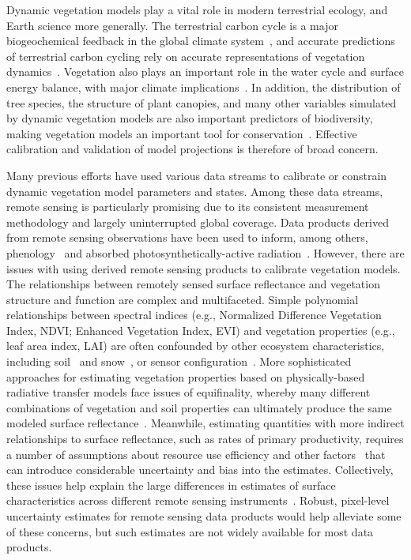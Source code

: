 \introduction

Dynamic vegetation models play a vital role in modern terrestrial ecology, and Earth science more generally.
The terrestrial carbon cycle is a major biogeochemical feedback in the global climate system~\citep{heinze_2019_esd_reviews}, and accurate predictions of terrestrial carbon cycling rely on accurate representations of vegetation dynamics~\citep{pacala_1995_details_that_matter}.
Vegetation also plays an important role in the water cycle and surface energy balance, with major climate implications~\citep{bonan2008forests}.
In addition, the distribution of tree species, the structure of plant canopies, and many other variables simulated by dynamic vegetation models are also important predictors of biodiversity, making vegetation models an important tool for conservation~\citep{mcmahon2011improving}.
Effective calibration and validation of model projections is therefore of broad concern.

Many previous efforts have used various data streams to calibrate or constrain dynamic vegetation model parameters and states.
Among these data streams, remote sensing is particularly promising due to its consistent measurement methodology and largely uninterrupted global coverage.
Data products derived from remote sensing observations have been used to inform, among others,
phenology~\citep{knorr2010carbon, viskari2015modeldata}
and absorbed photosynthetically-active radiation~\citep{peylin2016new, schurmann2016constraining, zobitz_2014_joint}.
However, there are issues with using derived remote sensing products to calibrate vegetation models.
The relationships between remotely sensed surface reflectance and vegetation structure and function are complex and multifaceted.
Simple polynomial relationships between spectral indices (e.g., Normalized Difference Vegetation Index, NDVI; Enhanced Vegetation Index, EVI) and vegetation properties (e.g., leaf area index, LAI) are often confounded by other ecosystem characteristics, including soil~\citep{myneni1994relationship} and snow~\citep{zhang2020evaluating}, or sensor configuration~\citep{fensholt2004evaluation}.
More sophisticated approaches for estimating vegetation properties based on physically-based radiative transfer models face issues of equifinality, whereby many different combinations of vegetation and soil properties can ultimately produce the same modeled surface reflectance~\citep{combal2003retrieval, lewis2007spectral}.
Meanwhile, estimating quantities with more indirect relationships to surface reflectance, such as rates of primary productivity, requires a number of assumptions about resource use efficiency and other factors~\citep{running2004continuous} that can introduce considerable uncertainty and bias into the estimates.
Collectively, these issues help explain the large differences in estimates of surface characteristics across different remote sensing instruments~\citep{liu_2018_satellite}.
Robust, pixel-level uncertainty estimates for remote sensing data products would help alleviate some of these concerns, but such estimates are not widely available for most data products.

